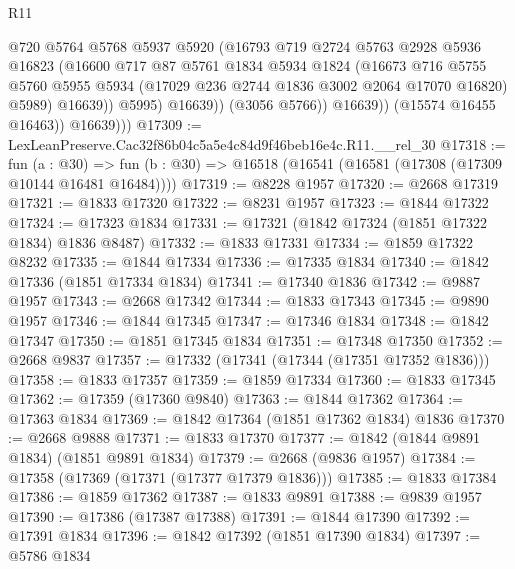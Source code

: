 \begin{lexlean}{R11}
\begin{coremodule}
                        @720
                        @5764
                        @5768
                        @5937
                        @5920
                        (@16793
                          @719
                          @2724
                          @5763
                          @2928
                          @5936
                          @16823
                          (@16600
                            @717
                            @87
                            @5761
                            @1834
                            @5934
                            @1824
                            (@16673
                              @716
                              @5755
                              @5760
                              @5955
                              @5934
                              (@17029 @236 @2744 @1836 @3002 @2064 @17070 @16820)
                              @5989)
                            @16639))
                        @5995)
                      @16639))
                  (@3056 @5766))
                @16639))
            (@15574 @16455 @16463))
          @16639)))
@17309 := LexLeanPreserve.Cac32f86b04c5a5e4c84d9f46beb16e4c.R11.__rel_30
@17318 := fun (a : @30) =>
  fun (b : @30) => @16518 (@16541 (@16581 (@17308 (@17309 @10144 @16481 @16484))))
@17319 := @8228 @1957
@17320 := @2668 @17319
@17321 := @1833 @17320
@17322 := @8231 @1957
@17323 := @1844 @17322
@17324 := @17323 @1834
@17331 := @17321 (@1842 @17324 (@1851 @17322 @1834) @1836 @8487)
@17332 := @1833 @17331
@17334 := @1859 @17322 @8232
@17335 := @1844 @17334
@17336 := @17335 @1834
@17340 := @1842 @17336 (@1851 @17334 @1834)
@17341 := @17340 @1836
@17342 := @9887 @1957
@17343 := @2668 @17342
@17344 := @1833 @17343
@17345 := @9890 @1957
@17346 := @1844 @17345
@17347 := @17346 @1834
@17348 := @1842 @17347
@17350 := @1851 @17345 @1834
@17351 := @17348 @17350
@17352 := @2668 @9837
@17357 := @17332 (@17341 (@17344 (@17351 @17352 @1836)))
@17358 := @1833 @17357
@17359 := @1859 @17334
@17360 := @1833 @17345
@17362 := @17359 (@17360 @9840)
@17363 := @1844 @17362
@17364 := @17363 @1834
@17369 := @1842 @17364 (@1851 @17362 @1834) @1836
@17370 := @2668 @9888
@17371 := @1833 @17370
@17377 := @1842 (@1844 @9891 @1834) (@1851 @9891 @1834)
@17379 := @2668 (@9836 @1957)
@17384 := @17358 (@17369 (@17371 (@17377 @17379 @1836)))
@17385 := @1833 @17384
@17386 := @1859 @17362
@17387 := @1833 @9891
@17388 := @9839 @1957
@17390 := @17386 (@17387 @17388)
@17391 := @1844 @17390
@17392 := @17391 @1834
@17396 := @1842 @17392 (@1851 @17390 @1834)
@17397 := @5786 @1834

\end{coremodule}
\end{lexlean}
